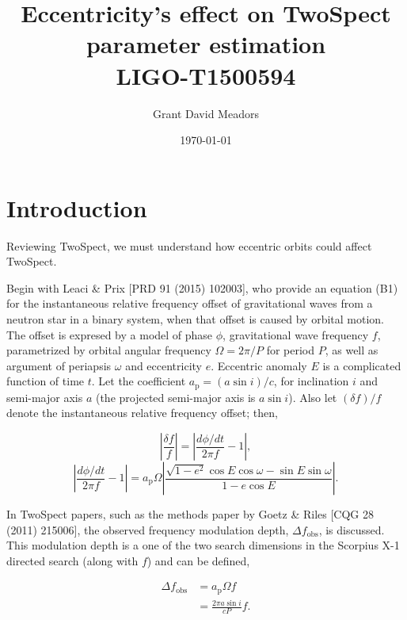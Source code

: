 \documentclass{article}
\begin{document}
\title{Eccentricity's effect on TwoSpect parameter estimation \\ 
LIGO-T1500594}
\author{Grant David Meadors}
\date{\today}

\maketitle

\section{Introduction}
Reviewing TwoSpect, we must understand how eccentric orbits could affect TwoSpect.

Begin with Leaci \& Prix [PRD 91 (2015) 102003], who provide an equation (B1) for the instantaneous relative frequency offset of gravitational waves from a neutron star in a binary system, when that offset is caused by orbital motion.
The offset is expresed by a model of phase $\phi$, gravitational wave frequency $f$, parametrized by orbital angular frequency $\Omega = 2 \pi/P$ for period $P$, as well as argument of periapsis $\omega$ and eccentricity $e$.
Eccentric anomaly $E$ is a complicated function of time $t$.
Let the coefficient $a_\mathrm{p} = (a \sin i)/c$, for inclination $i$ and semi-major axis $a$ (the projected semi-major axis is $a \sin i$). 
Also let $(\delta f) / f$ denote the instantaneous relative frequency offset; then,

\begin{equation}
\left|\frac{\delta f}{f}\right| = \left| \frac{d \phi/dt}{2 \pi f} - 1 \right|,
\label{irfo_def}
\end{equation}
\begin{equation}
\left| \frac{d\phi/dt}{2\pi f} -1 \right| = a_\mathrm{p} \Omega \left|\frac{\sqrt{1-e^2} \cos E \cos \omega - \sin E \sin \omega}{1-e \cos E} \right|.
\label{irfo}
\end{equation}

In TwoSpect papers, such as the methods paper by Goetz \& Riles [CQG 28 (2011) 215006], the observed frequency modulation depth, $\Delta f_\mathrm{obs}$, is discussed.
This modulation depth is a one of the two search dimensions in the Scorpius X-1 directed search (along with $f$) and can be defined,

\begin{eqnarray}
\Delta f_\mathrm{obs} &= a_\mathrm{p} \Omega f \nonumber \\
    &= \frac{2\pi a \sin i}{cP} f.
\label{moddepth_def}
\end{eqnarray}
\end{document}
